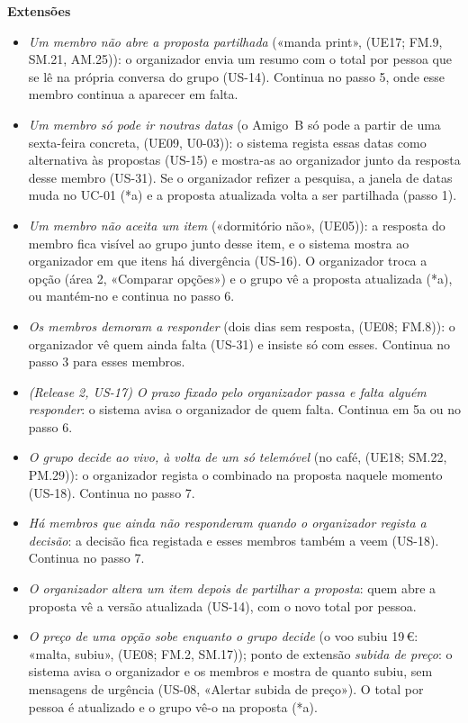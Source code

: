 \documentclass[11pt,a4paper]{article}
\newcommand{\reg}[1]{{\footnotesize\textcolor{pendente}{(#1)}}}
\newenvironment{usecase}[2]{%
  \par\medskip\noindent{\large\bfseries\color{roamly}#1: #2}\par\smallskip\small\noindent\ignorespaces}{\par\medskip}
\begin{document}
\begin{usecase}{UC-04}{Levar o grupo a decidir sobre a proposta}
\textbf{Extensões}
\begin{itemize}[leftmargin=2.2em]
  \item[2a.] \textit{Um membro não abre a proposta partilhada} («manda print», \reg{UE17; FM.9, SM.21, AM.25}): o organizador envia um resumo com o total por pessoa que se lê na própria conversa do grupo (US-14). Continua no passo 5, onde esse membro continua a aparecer em falta.
  \item[3a.] \textit{Um membro só pode ir noutras datas} (o Amigo~B só pode a partir de uma sexta-feira concreta, \reg{UE09, U0-03}): o sistema regista essas datas como alternativa às propostas (US-15) e mostra-as ao organizador junto da resposta desse membro (US-31). Se o organizador refizer a pesquisa, a janela de datas muda no UC-01 (*a) e a proposta atualizada volta a ser partilhada (passo 1).
  \item[4a.] \textit{Um membro não aceita um item} («dormitório não», \reg{UE05}): a resposta do membro fica visível ao grupo junto desse item, e o sistema mostra ao organizador em que itens há divergência (US-16). O organizador troca a opção (área 2, «Comparar opções») e o grupo vê a proposta atualizada (*a), ou mantém-no e continua no passo 6.
  \item[5a.] \textit{Os membros demoram a responder} (dois dias sem resposta, \reg{UE08; FM.8}): o organizador vê quem ainda falta (US-31) e insiste só com esses. Continua no passo 3 para esses membros.
  \item[5b.] \textit{(Release 2, US-17) O prazo fixado pelo organizador passa e falta alguém responder}: o sistema avisa o organizador de quem falta. Continua em 5a ou no passo 6.
  \item[6a.] \textit{O grupo decide ao vivo, à volta de um só telemóvel} (no café, \reg{UE18; SM.22, PM.29}): o organizador regista o combinado na proposta naquele momento (US-18). Continua no passo 7.
  \item[6b.] \textit{Há membros que ainda não responderam quando o organizador regista a decisão}: a decisão fica registada e esses membros também a veem (US-18). Continua no passo 7.
  \item[*a.] \textit{O organizador altera um item depois de partilhar a proposta}: quem abre a proposta vê a versão atualizada (US-14), com o novo total por pessoa.
  \item[*b.] \textit{O preço de uma opção sobe enquanto o grupo decide} (o voo subiu 19\,€: «malta, subiu», \reg{UE08; FM.2, SM.17}); ponto de extensão \textit{subida de preço}: o sistema avisa o organizador e os membros e mostra de quanto subiu, sem mensagens de urgência (US-08, «Alertar subida de preço»). O total por pessoa é atualizado e o grupo vê-o na proposta (*a).
\end{itemize}


\end{usecase}
\end{document}
